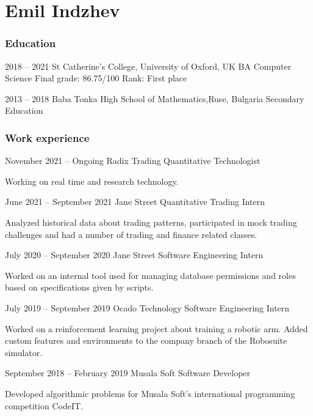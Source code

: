 \documentclass{tccv}
\begin{document}
\part{Emil Indzhev}

\section{Education}

\begin{yearlist}

\item{2018 -- 2021}
     {St Catherine's College, \newline
     University of Oxford, UK}
     {BA Computer Science \newline
     Final grade: 86.75/100 \newline
     Rank: First place}

\item{2013 -- 2018}
     {Baba Tonka High School of Mathematics,\newline Ruse, Bulgaria}
     {Secondary Education}

\end{yearlist}

\section{Work experience}

\begin{eventlist}

\item{November 2021 -- Ongoing}
     {Radix Trading}
     {Quantitative Technologist}

Working on real time and research technology.

\item{June 2021 -- September 2021}
     {Jane Street}
     {Quantitative Trading Intern}

Analyzed historical data about trading patterns,
participated in mock trading challenges and had a number of
trading and finance related classes. 

\item{July 2020 -- September 2020}
     {Jane Street}
     {Software Engineering Intern}

Worked on an internal tool used for managing database permissions and roles
based on specifications given by scripts.

\item{July 2019 -- September 2019}
     {Ocado Technology}
     {Software Engineering Intern}

Worked on a reinforcement learning project about training a robotic arm. Added custom features and environments to the company branch of the Robosuite simulator.

\item{September 2018 -- February 2019}
     {Musala Soft}
     {Software Developer}

Developed algorithmic problems for Musala Soft's international programming competition CodeIT.

\end{eventlist}
\end{document}
